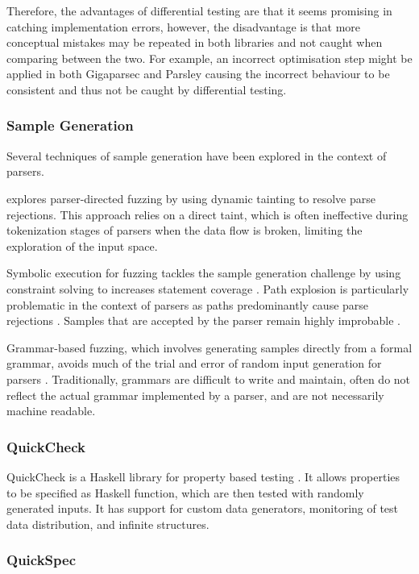 \documentclass[11pt]{article}
\let\oldciteauthor\citeauthor
\renewcommand{\citeauthor}[1]{\oldciteauthor{#1} \cite{#1}}
\begin{document}
Therefore, the advantages of differential testing are that it seems promising in catching implementation errors, however, the disadvantage is that more conceptual mistakes may be repeated in both libraries and not caught when comparing between the two. For example, an incorrect optimisation step might be applied in both Gigaparsec and Parsley causing the incorrect behaviour to be consistent and thus not be caught by differential testing.

\subsubsection{Sample Generation}
Several techniques of sample generation have been explored in the context of parsers. 

\citeauthor{parser-directed} explores parser-directed fuzzing by using dynamic tainting to resolve parse rejections. This approach relies on a direct taint, which is often ineffective during tokenization stages of parsers when the data flow is broken, limiting the exploration of the input space.

Symbolic execution for fuzzing tackles the sample generation challenge by using constraint solving to increases statement coverage \cite{klee}. Path explosion is particularly problematic in the context of parsers as paths predominantly cause parse rejections \cite{path-explosion}. Samples that are accepted by the parser remain highly improbable \cite{parser-directed}.

Grammar-based fuzzing, which involves generating samples directly from a formal grammar, avoids much of the trial and error of random input generation for parsers \cite{grammar}. Traditionally, grammars are difficult to write and maintain, often do not reflect the actual grammar implemented by a parser, and are not necessarily machine readable.

\subsubsection{QuickCheck}

QuickCheck is a Haskell library for property based testing \cite{quickcheck}. It allows properties to be specified as Haskell function, which are then tested with randomly generated inputs. It has support for custom data generators, monitoring of test data distribution, and infinite structures. 

\subsubsection{QuickSpec}
\end{document}
